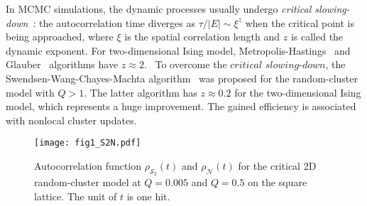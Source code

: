 \documentclass[aps,pre,twocolumn,superscriptaddress,longbibliography,floatfix]{revtex4-2}
\begin{document}
In MCMC simulations, the dynamic processes {usually} undergo {\it critical slowing-down}~\cite{hohenberg1977theory}: 
the autocorrelation time diverges as $\tau/{|E|} \sim \xi^z$ when the critical point is {being} approached, 
where $\xi$ is the spatial correlation length and $z$ is {called the} dynamic exponent. For two-dimensional Ising model, 
Metropolis-Hastings~\cite{metropolis1953equation,hastings1970monte} and Glauber~\cite{glauber1963time,landau2005guide} algorithms have $z\approx 2$. 
~To overcome the $critical$ $slowing$-$down$, the Swendsen-Wang-Chayes-Machta algorithm~\cite{swendsen1987nonuniversal,chayes1998graphical} was proposed for the random-cluster model with $Q>1$. 
The latter algorithm has $z\approx 0.2$ for the two-dimensional Ising model, 
which represents a huge improvement. 
The gained efficiency is associated with nonlocal cluster updates.

\begin{figure}[t]
    \centering
    \texttt{[image: fig1\_S2N.pdf]}
    \caption{Autocorrelation function $\rho_{\mathcal{S}_2}(t)$ and $\rho_{\mathcal{N}}(t)$ for the critical 2D random-cluster model at $Q=0.005$ and $Q=0.5$ on the square lattice. The unit of $t$ is one hit.}
    \label{S2N}
\end{figure}
\end{document}
